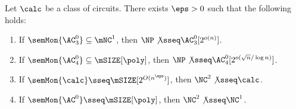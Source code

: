 \documentclass[11pt]{article}
\begin{document}
\begin{theorem}
    \label{cor:xor-sat-ag}
    Let $\calc$ be 
    a class of circuits.
    There exists $\eps > 0$ such that
    the following holds:
    \begin{enumerate}
        \item 
            \label{item:ac03}
            If $\semMon{\AC^0_3} \subseteq \mNC^1$,
            then 
            $\NP 
            \not\sseq
            \AC^0_3[2^{o(n)}]$.
        \item 
            \label{item:ac04}
            If 
            $\semMon{\AC^0_4} \subseteq \mSIZE[\poly]$,
            then 
            $\NP 
            \not\sseq
            \AC^0_4[ 2^{o( \sqrt{n}/\log n )} ]$.
        \item 
            \label{item:subexp}
            If $\semMon{\calc} \sseq \mSIZE[2^{O(n^\eps)}]$,
            then 
            $\NC^2 
            \not\sseq
            \calc$.
        \item 
            \label{item:ac-poly}
            If 
            $\semMon{\AC^0} 
            \sseq 
            \mSIZE[\poly]$,
            then
            $\NC^2 
            \not\sseq
            \NC^1$.
    \end{enumerate}
\end{theorem}
\end{document}
